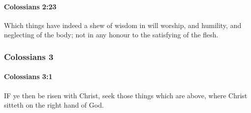 		\paragraph{Colossians 2:23} %
			\label{COLOSSIANS-2-23}

			Which things have indeed a shew of wisdom in will worship, and humility, and neglecting of the body; not in any honour to the satisfying of the flesh.

			\begin{framed}
		\scriptsize
				\begin{compactdesc}
					\item[SBLG] 
				\end{compactdesc}
			\end{framed}

	\subsubsection{Colossians 3} %
		\label{COLOSSIANS-3}
		
		\paragraph{Colossians 3:1} %
			\label{COLOSSIANS-3-1}

			IF ye then be risen with Christ, seek those things which are above, where Christ sitteth on the right hand of God.

